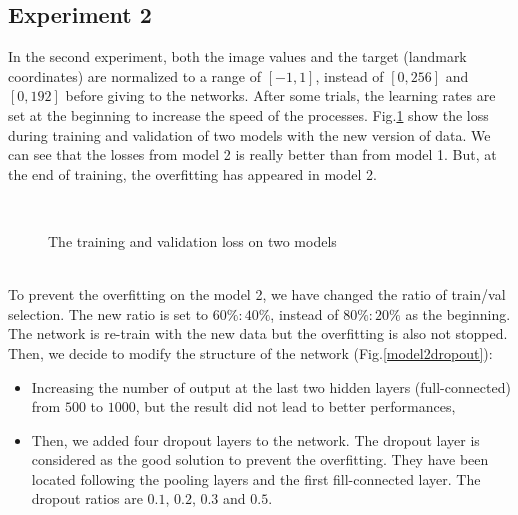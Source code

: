\documentclass[12pt,a4paper]{article}
\begin{document}
\subsection{Experiment 2}
In the second experiment, both the image values and the target (landmark coordinates) are normalized to a range of $[-1,1]$, instead of $[0,256]$ and $[0,192]$ before giving to the networks\cite{lecun2012efficient}. After some trials, the learning rates are set at the beginning to increase the speed of the processes. Fig.\ref{expr2} show the loss during training and validation of two models with the new version of data. We can see that the losses from model 2 is really better than from model 1. But, at the end of training, the overfitting has appeared in model 2.
\begin{figure}[h!]
\centering
{}~~
\caption{The training and validation loss on two models}
\label{expr2}
\end{figure}~\\
To prevent the overfitting on the model 2, we have changed the ratio of train/val selection. The new ratio is set to $60\%:40\%$, instead of $80\%:20\%$ as the beginning. The network is re-train with the new data but the overfitting is also not stopped. Then, we decide to modify the structure of the network (Fig.\ref{model2dropout}):
\begin{itemize}
	\item Increasing the number of output at the last two hidden layers (full-connected) from $500$ to $1000$, but the result did not lead to better performances,
	\item Then, we added four dropout layers to the network. The dropout layer is considered as the good solution to prevent the overfitting\cite{srivastava2014dropout}. They have been located following the pooling layers and the first fill-connected layer. The dropout ratios are $0.1$, $0.2$, $0.3$ and $0.5$.
\end{itemize}
\end{document}
